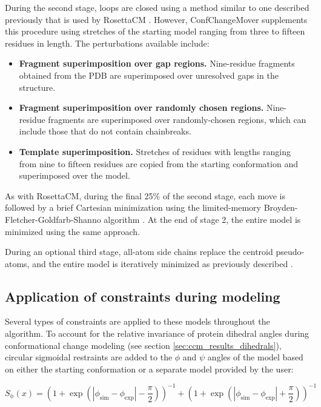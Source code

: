 During the second stage, loops are closed using a method similar to one described previously \citep*{Rohl2004} that is used by RosettaCM \citep*{Song2013}. However, ConfChangeMover supplements this procedure using stretches of the starting model ranging from three to fifteen residues in length. The perturbations available include:

\begin{itemize}
    \item \textbf{Fragment superimposition over gap regions.} Nine-residue fragments obtained from the PDB are superimposed over unresolved gaps in the structure.
    \item \textbf{Fragment superimposition over randomly chosen regions.} Nine-residue fragments are superimposed over randomly-chosen regions, which can include those that do not contain chainbreaks.
    \item \textbf{Template superimposition.} Stretches of residues with lengths ranging from nine to fifteen residues are copied from the starting conformation and superimposed over the model.
\end{itemize}

As with RosettaCM, during the final 25\% of the second stage, each move is followed by a brief Cartesian minimization \citep*{Conway2014} using the limited-memory Broyden-Fletcher-Goldfarb-Shanno algorithm \citep*{Byrd1995}. At the end of stage 2, the entire model is minimized using the same approach.

During an optional third stage, all-atom side chains replace the centroid pseudo-atoms, and the entire model is iteratively minimized as previously described \citep*{Conway2014, Song2013}.

\subsection{Application of constraints during modeling}\label{sec:confchangemover_restraints}

Several types of constraints are applied to these models throughout the algorithm. To account for the relative invariance of protein dihedral angles during conformational change modeling (see section \ref{sec:ccm_results_dihedrals}), circular sigmoidal restraints are added to the $\phi$ and $\psi$ angles of the model based on either the starting conformation or a separate model provided by the user:

\begin{equation}
    S_{\upphi}(x) = \left( 1 + \exp \left( | \phi_{\mathup{sim}} - \phi_{\mathup{exp}} | - \frac{\pi}{2} \right) \right)^{-1} + \left( 1 + \exp \left( | \phi_{\mathup{sim}} - \phi_{\mathup{exp}} | + \frac{\pi}{2} \right) \right)^{-1}
\end{equation}

